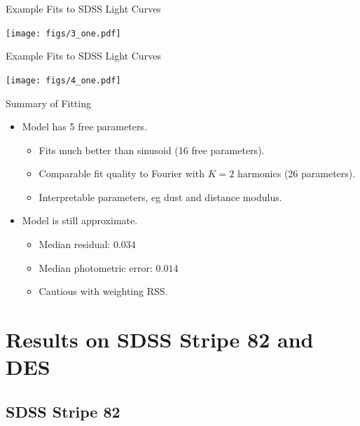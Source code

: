 \documentclass[12pt]{beamer}
\begin{document}
\begin{frame}{Example Fits to SDSS Light Curves}
\begin{center}
  \texttt{[image: figs/3\_one.pdf]}
\end{center}
\end{frame}

\begin{frame}{Example Fits to SDSS Light Curves}
\begin{center}
  \texttt{[image: figs/4\_one.pdf]}
\end{center}
\end{frame}



\begin{frame}{Summary of Fitting}

  \begin{itemize}
  \item Model has 5 free parameters.
    \begin{itemize}
    \item Fits much better than sinusoid (16 free parameters).
    \item Comparable fit quality to Fourier with $K=2$ harmonics (26 parameters).
    \item Interpretable parameters, eg dust and distance modulus.
    \end{itemize}
  \item Model is still approximate.
    \begin{itemize}
      \item Median residual: $0.034$
      \item Median photometric error: $0.014$
      \item Cautious with weighting RSS.
    \end{itemize}

    \end{itemize}
  
\end{frame}





\section{Results on SDSS Stripe 82 and DES}


\subsection{SDSS Stripe 82}
\end{document}
